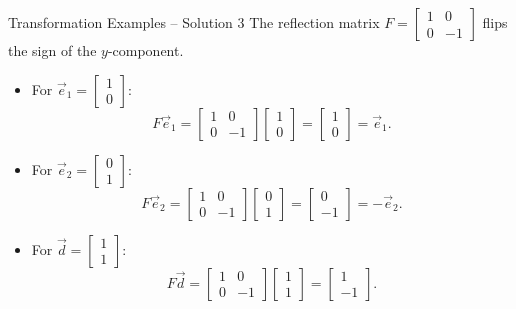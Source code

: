 \documentclass{beamer}
\begin{document}
\begin{frame}{Transformation Examples -- Solution 3}
  The reflection matrix \(F = \begin{bmatrix} 1 & 0 \\ 0 & -1 \end{bmatrix}\) flips the sign of the \(y\)-component.
  \begin{itemize}
    \item For \(\vec{e}_1 = \begin{bmatrix} 1 \\ 0 \end{bmatrix}\):
    \begin{equation}
      F\vec{e}_1 = \begin{bmatrix} 1 & 0 \\ 0 & -1 \end{bmatrix}\begin{bmatrix} 1 \\ 0 \end{bmatrix} = \begin{bmatrix} 1 \\ 0 \end{bmatrix} = \vec{e}_1.
    \end{equation}
    \item For \(\vec{e}_2 = \begin{bmatrix} 0 \\ 1 \end{bmatrix}\):
    \begin{equation}
      F\vec{e}_2 = \begin{bmatrix} 1 & 0 \\ 0 & -1 \end{bmatrix}\begin{bmatrix} 0 \\ 1 \end{bmatrix} = \begin{bmatrix} 0 \\ -1 \end{bmatrix} = -\vec{e}_2.
    \end{equation}
    \item For \(\vec{d} = \begin{bmatrix} 1 \\ 1 \end{bmatrix}\):
    \begin{equation}
      F\vec{d} = \begin{bmatrix} 1 & 0 \\ 0 & -1 \end{bmatrix}\begin{bmatrix} 1 \\ 1 \end{bmatrix} = \begin{bmatrix} 1 \\ -1 \end{bmatrix}.
    \end{equation}
  \end{itemize}
\end{frame}
\end{document}
